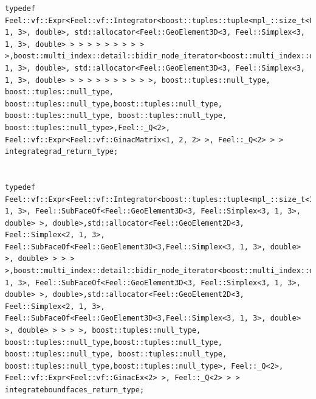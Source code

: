 \documentclass[french,12pt]{article}
\begin{document}
\begin{lstlisting}
typedef Feel::vf::Expr<Feel::vf::Integrator<boost::tuples::tuple<mpl_::size_t<0>,boost::multi_index::detail::bidir_node_iterator<boost::multi_index::detail::ordered_index_node<boost::multi_index::detail::ordered_index_node<boost::multi_index::detail::ordered_index_node<boost::multi_index::detail::ordered_index_node<boost::multi_index::detail::ordered_index_node<boost::multi_index::detail::ordered_index_node<boost::multi_index::detail::ordered_index_node<boost::multi_index::detail::index_node_base<Feel::GeoElement3D<3,Feel::Simplex<3, 1, 3>, double>, std::allocator<Feel::GeoElement3D<3, Feel::Simplex<3, 1, 3>, double> > > > > > > > > > >,boost::multi_index::detail::bidir_node_iterator<boost::multi_index::detail::ordered_index_node<boost::multi_index::detail::ordered_index_node<boost::multi_index::detail::ordered_index_node<boost::multi_index::detail::ordered_index_node<boost::multi_index::detail::ordered_index_node<boost::multi_index::detail::ordered_index_node<boost::multi_index::detail::ordered_index_node<boost::multi_index::detail::index_node_base<Feel::GeoElement3D<3,Feel::Simplex<3, 1, 3>, double>, std::allocator<Feel::GeoElement3D<3, Feel::Simplex<3, 1, 3>, double> > > > > > > > > > >, boost::tuples::null_type, boost::tuples::null_type, boost::tuples::null_type,boost::tuples::null_type, boost::tuples::null_type, boost::tuples::null_type, boost::tuples::null_type>,Feel::_Q<2>, Feel::vf::Expr<Feel::vf::GinacMatrix<1, 2, 2> >, Feel::_Q<2> > > integrategrad_return_type;


typedef Feel::vf::Expr<Feel::vf::Integrator<boost::tuples::tuple<mpl_::size_t<1>,boost::multi_index::detail::bidir_node_iterator<boost::multi_index::detail::ordered_index_node<boost::multi_index::detail::index_node_base<Feel::GeoElement2D<3,Feel::Simplex<2, 1, 3>, Feel::SubFaceOf<Feel::GeoElement3D<3, Feel::Simplex<3, 1, 3>, double> >, double>,std::allocator<Feel::GeoElement2D<3, Feel::Simplex<2, 1, 3>, Feel::SubFaceOf<Feel::GeoElement3D<3,Feel::Simplex<3, 1, 3>, double> >, double> > > > >,boost::multi_index::detail::bidir_node_iterator<boost::multi_index::detail::ordered_index_node<boost::multi_index::detail::index_node_base<Feel::GeoElement2D<3,Feel::Simplex<2, 1, 3>, Feel::SubFaceOf<Feel::GeoElement3D<3, Feel::Simplex<3, 1, 3>, double> >, double>,std::allocator<Feel::GeoElement2D<3, Feel::Simplex<2, 1, 3>, Feel::SubFaceOf<Feel::GeoElement3D<3,Feel::Simplex<3, 1, 3>, double> >, double> > > > >, boost::tuples::null_type, boost::tuples::null_type,boost::tuples::null_type, boost::tuples::null_type, boost::tuples::null_type, boost::tuples::null_type,boost::tuples::null_type>, Feel::_Q<2>, Feel::vf::Expr<Feel::vf::GinacEx<2> >, Feel::_Q<2> > > integrateboundfaces_return_type;



\end{lstlisting}
\end{document}
